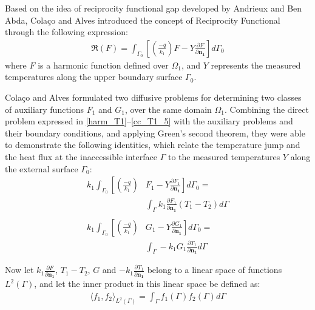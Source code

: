 \documentclass[conference,compsoc,fleqn]{IEEEtran}
\begin{document}

Based on the idea of reciprocity functional gap developed by Andrieux and Ben Abda\cite{artigo_andrieux}, Colaço and Alves\cite{reciproc_3} introduced the concept of Reciprocity Functional through the following expression:
\begin{align}
	\Re(F) = \int_{\Gamma_0}\left[\left(\frac{-q}{k_1}\right)F - Y\frac{\partial F}{\partial\mathbf{n_1}}\right]d\Gamma_0
	\label{def_funcional_reciprocidade}
\end{align}
where $F$ is a harmonic function defined over $\Omega_1$, and $Y$ represents the measured temperatures along the upper boundary surface $\Gamma_0$.

Colaço and Alves\cite{reciproc_3} formulated two diffusive problems for determining two classes of auxiliary functions $F_1$ and $G_1$, over the same domain $\Omega_1$. Combining the direct problem expressed in \eqref{harm_T1}--\eqref{cc_T1_5} with the auxiliary problems and their boundary conditions, and applying Green's second theorem, they were able to demonstrate the following identities, which relate the temperature jump and the heat flux at the inaccessible interface $\Gamma$ to the measured temperatures $Y$ along the external surface $\Gamma_0$:
\begin{align}
	k_1\int_{\Gamma_0}\left[\left(\frac{-q}{k_1}\right)\right. & \left.F_1 - Y\frac{\partial F_1}{\partial\mathbf{n_1}}\right]d\Gamma_0
	= \nonumber \\
	& \int_\Gamma k_1 \frac{\partial F_1}{\partial\mathbf{n_1}}\left(T_1 - T_2\right)d\Gamma
	\label{identidade_T} \\ \nonumber \\
	k_1\int_{\Gamma_0}\left[\left(\frac{-q}{k_1}\right)\right. & \left.G_1 -  Y\frac{\partial G_1}{\partial\mathbf{n_1}}\right]d\Gamma_0
	= \nonumber \\
	& \int_\Gamma -k_1 G_1 \frac{\partial T_1}{\partial\mathbf{n_1}}d\Gamma
	\label{identidade_q}
\end{align}

Now let $k_1 \frac{\partial F}{\partial\mathbf{n_1}}$, $T_1 - T_2$, $G$ and $-k_1 \frac{\partial T_1}{\partial\mathbf{n_1}}$ belong to a linear space of functions $L^2(\Gamma)$, and let the inner product in this linear space be defined as:
\begin{align}
	\langle f_1, f_2\rangle_{L^2(\Gamma)} = \int_\Gamma f_1(\Gamma) f_2(\Gamma) d\Gamma \label{definicao_innner_product}
\end{align} 
\end{document}
